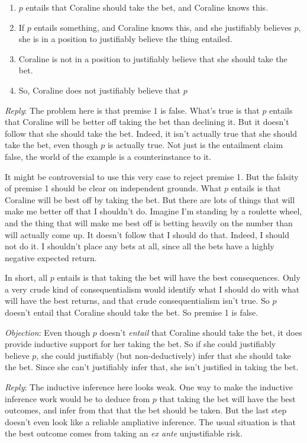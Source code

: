 \begin{enumerate}
\item $p$ entails that Coraline should take the bet, and Coraline knows this.
\item If $p$ entails something, and Coraline knows this, and she justifiably believes $p$, she is in a position to justifiably believe the thing entailed.
\item Coraline is not in a position to justifiably believe that she should take the bet.
\argconc
\item So, Coraline does not justifiably believe that $p$
\end{enumerate}

\textit{Reply}: The problem here is that premise 1 is false. What's true is that $p$ entails that Coraline will be better off taking the bet than declining it. But it doesn't follow that she should take the bet. Indeed, it isn't actually true that she should take the bet, even though $p$ is actually true. Not just is the entailment claim false, the world of the example is a counterinstance to it.

It might be controversial to use this very case to reject premise 1. But the falsity of premise 1 should be clear on independent grounds. What $p$ entails is that Coraline will be best off by taking the bet. But there are lots of things that will make me better off that I shouldn't do.  Imagine I'm standing by a roulette wheel, and the thing that will make me best off is betting heavily on the number than will actually come up. It doesn't follow that I should do that. Indeed, I should not do it. I shouldn't place any bets at all, since all the bets have a highly negative expected return. 

In short, all $p$ entails is that taking the bet will have the best consequences. Only a very crude kind of consequentialism would identify what I should do with what will have the best returns, and that crude consequentialism isn't true. So $p$ doesn't entail that Coraline should take the bet. So premise 1 is false.

\textit{Objection}: 
Even though $p$ doesn't \textit{entail} that Coraline should take the bet, it does provide inductive support for her taking the bet. So if she could justifiably believe $p$, she could justifiably (but non-deductively) infer that she should take the bet. Since she can't justifiably infer that, she isn't justified in taking the bet.

\textit{Reply}:
The inductive inference here looks weak. One way to make the inductive inference work would be to deduce from $p$ that taking the bet will have the best outcomes, and infer from that that the bet should be taken. But the last step doesn't even look like a reliable ampliative inference. The usual situation is that the best outcome comes from taking an \textit{ex ante} unjustifiable risk.

